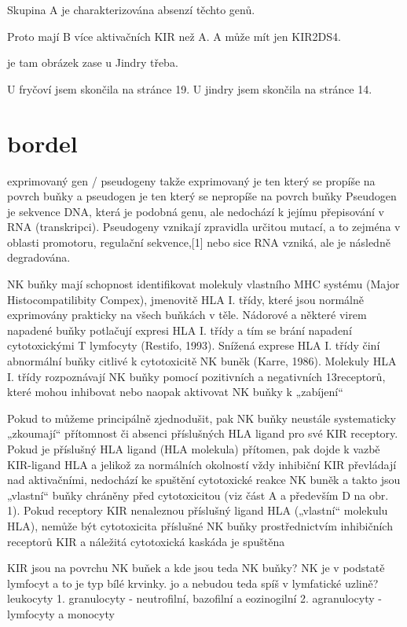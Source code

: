 \documentclass[czech,DP]{thesiskiv}
\begin{document}
Skupina A je charakterizována absenzí těchto genů. 

Proto mají B více aktivačních KIR než A. A může mít jen KIR2DS4.

je tam obrázek zase u Jindry třeba.

U fryčoví jsem skončila na stránce 19. 
U jindry jsem skončila na stránce 14.





\section{bordel}
exprimovaný gen / pseudogeny
takže exprimovaný je ten který se propíše na povrch buňky a pseudogen je ten který se nepropíše na povrch buňky
Pseudogen je sekvence DNA, která je podobná genu, ale nedochází k jejímu přepisování v RNA (transkripci). Pseudogeny vznikají zpravidla určitou mutací, a to zejména v oblasti promotoru, regulační sekvence,[1] nebo sice RNA vzniká, ale je následně degradována.


NK buňky mají schopnost identifikovat molekuly vlastního MHC systému (Major
Histocompatilibity Compex), jmenovitě HLA I. třídy, které jsou normálně exprimovány
prakticky na všech buňkách v těle. Nádorové a některé virem napadené buňky potlačují
expresi HLA I. třídy a tím se brání napadení cytotoxickými T lymfocyty (Restifo, 1993).
Snížená exprese HLA I. třídy činí abnormální buňky citlivé k cytotoxicitě NK buněk (Karre,
1986). Molekuly HLA I. třídy rozpoznávají NK buňky pomocí pozitivních a negativních
13receptorů, které mohou inhibovat nebo naopak aktivovat NK buňky k „zabíjení“

Pokud to můžeme principálně zjednodušit, pak NK buňky neustále
systematicky „zkoumají“ přítomnost či absenci příslušných HLA
ligand pro své KIR receptory. Pokud je příslušný HLA ligand (HLA
molekula) přítomen, pak dojde k vazbě KIR-ligand HLA a jelikož za
normálních okolností vždy inhibiční KIR převládají nad aktivačními,
nedochází ke spuštění cytotoxické reakce NK buněk a takto jsou
„vlastní“ buňky chráněny před cytotoxicitou (viz část A a především D
na obr. 1). Pokud receptory KIR nenaleznou příslušný ligand HLA
(„vlastní“ molekulu HLA), nemůže být cytotoxicita příslušné NK buňky
prostřednictvím inhibičních receptorů KIR a náležitá cytotoxická
kaskáda je spuštěna


KIR jsou na povrchu NK buňek a kde jsou teda NK buňky? 
NK je v podstatě lymfocyt a to je typ bílé krvinky. jo a nebudou teda spíš  v lymfatické uzlině? 
leukocyty 1. granulocyty - neutrofilní, bazofilní a eozinogilní
		2. agranulocyty - lymfocyty a monocyty
		
\end{document}
